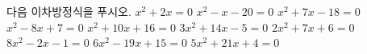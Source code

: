 다음 이차방정식을 푸시오.
 $x^2+2x=0$
 $x^2-x-20=0$
 $x^2+7x-18=0$
 $x^2-8x+7=0$
 $x^2+10x+16=0$
 $3x^2+14x-5=0$
 $2x^2+7x+6=0$
 $8x^2-2x-1=0$
 $6x^2-19x+15=0$
 $5x^2+21x+4=0$
